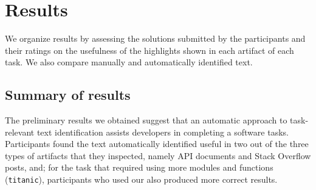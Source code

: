 
\section{Results}
\label{cp6:results}

We organize results by assessing the solutions submitted by the participants
and their ratings on the usefulness of the highlights shown 
in each artifact of each task. We also compare manually and automatically identified text.









\subsection{Summary of results}


The preliminary results we obtained suggest that 
an automatic approach to task-relevant text identification
assists 
developers in completing a software tasks. 
Participants found the text automatically identified
useful in two out of the three types of artifacts that they inspected, 
namely API documents and Stack Overflow posts, and; 
for the task that required using more modules and functions (\texttt{titanic}),
participants who used our also produced more correct results.




